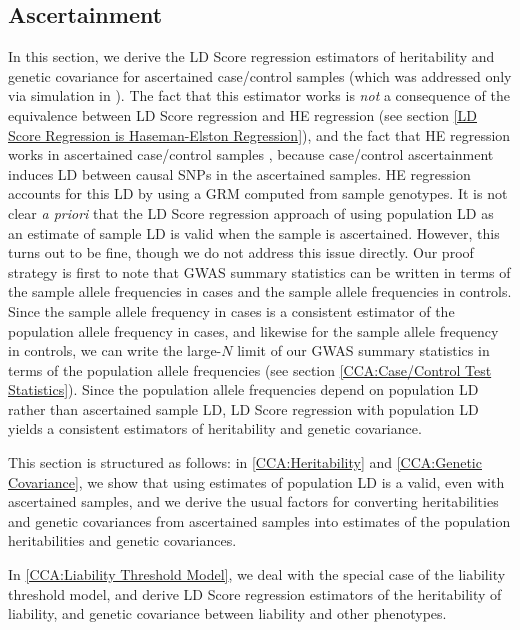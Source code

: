 \documentclass[11pt]{article}
\numberwithin{equation}{section}
\numberwithin{definition}{section}
\numberwithin{thm}{section}
\numberwithin{lemma}{section}
\numberwithin{prop}{section}
\numberwithin{cor}{section}
\numberwithin{hyp}{section}
\begin{document}
\subsection{Ascertainment}

In this section, we derive the LD Score regression estimators of heritability and genetic covariance for ascertained case/control
samples (which was addressed only via simulation in \cite{buliksullivan2014}).
The fact that this estimator works is \emph{not} a consequence of the equivalence between LD Score regression and HE 
regression (see section \ref{LD Score Regression is Haseman-Elston Regression}),
and the fact that HE regression works in ascertained case/control samples \cite{golan2013narrowing},
because case/control ascertainment induces LD between causal SNPs in the ascertained samples. 
HE regression accounts for this LD by using a GRM computed from sample genotypes. 
It is not clear \emph{a priori} that the LD Score regression approach of using population LD as an estimate of sample LD
is valid when the sample is ascertained.
However, this turns out to be fine,
though we do not address this issue directly.
Our proof strategy is first to note that GWAS summary statistics can be written in terms of the sample allele frequencies in cases and the sample allele frequencies
in controls. 
Since the sample allele frequency in cases is a consistent estimator of the population allele frequency in cases, and likewise for the sample allele frequency in controls, 
we can write the large-$N$ limit of our GWAS summary statistics in terms of the population allele frequencies (see section \ref{CCA:Case/Control Test Statistics}).
Since the population allele frequencies depend on population LD rather than ascertained sample LD, LD Score regression with population LD yields a consistent
estimators of heritability and genetic covariance.

This section is structured as follows: 
in \ref{CCA:Heritability} and \ref{CCA:Genetic Covariance}, 
we show that using estimates of population LD is a valid, even with ascertained samples,
and we derive the usual factors for converting heritabilities and genetic covariances from ascertained samples into
estimates of the population heritabilities and genetic covariances.

In \ref{CCA:Liability Threshold Model}, we deal with the special case of the liability threshold model, and derive LD Score 
regression estimators of the heritability of liability, and genetic covariance between liability and other phenotypes.
\end{document}
